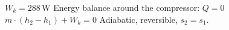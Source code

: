 \( W_k = 288 \, \text{W} \)  
Energy balance around the compressor:  
\( Q = 0 \)  
\( \dot{m} \cdot \left( h_2 - h_1 \right) + W_k = 0 \)  
Adiabatic, reversible, \( s_{2} = s_{1} \).